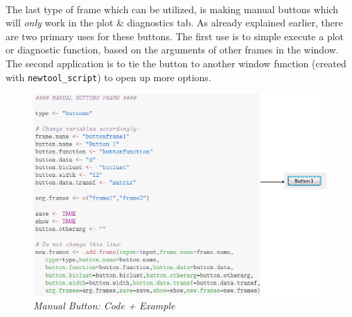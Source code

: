 \documentclass[a4paper]{article}\usepackage[]{graphicx}\usepackage[]{color}
\begin{document}
\\
The last type of frame which can be utilized, is making manual buttons which
will {\it only} work in the plot \& diagnostics tab. As already explained
earlier, there are two primary uses for these buttons. The first use is to
simple execute a plot or diagnostic function, based on the arguments of other frames in
the window. The second application is to tie the button to another window
function (created with \verb|newtool_script|) to open up more options.

\begin{figure}[H]
\centering
\includegraphics[scale=0.5]{figures/manualbutton.png}
\caption{{\it Manual Button: Code + Example}
\label{manualbutton}}
\end{figure}
\end{document}
